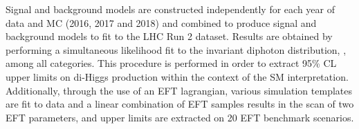 Signal and background models are constructed independently for each year of data and MC (2016, 2017 and 2018) and combined to produce signal and background models to fit to the LHC Run 2 dataset. Results are obtained by performing a simultaneous
likelihood fit to the invariant diphoton distribution, \mgg, among all categories. This procedure is performed in order to extract 95\% CL upper limits on di-Higgs production within the context of the SM interpretation. Additionally, through the use of an EFT lagrangian, various simulation templates are fit to data and a linear combination of EFT samples results in the scan of two EFT parameters, and upper limits are extracted on 20 EFT benchmark scenarios. 